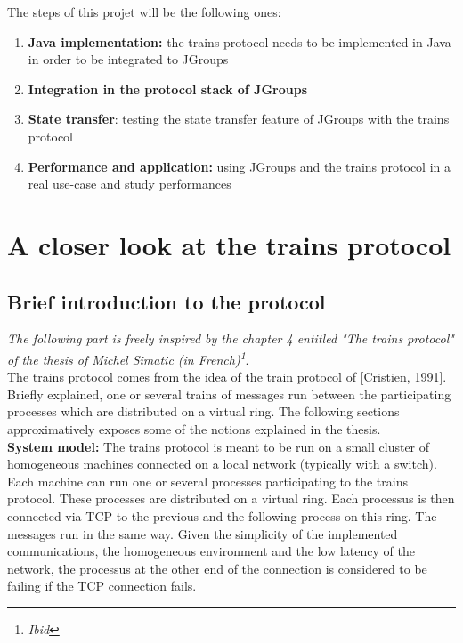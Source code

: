 \documentclass[a4paper,10pt]{report}
\begin{document}
The steps of this projet will be the following ones: 

\begin{enumerate}
  \item \textbf{Java implementation:} the trains protocol needs to be implemented in Java in order to be integrated to JGroups
  \item \textbf{Integration in the protocol stack of JGroups}
  \item \textbf{State transfer}: testing the state transfer feature of JGroups with the trains protocol
  \item \textbf{Performance and application:} using JGroups and the trains protocol in a real use-case and study performances
\end{enumerate}

\section{A closer look at the trains protocol}

\subsection{Brief introduction to the protocol}

\textit{The following part is freely inspired by the chapter 4 entitled "The trains protocol" of the thesis of Michel Simatic (in French)\footnote{\textit{Ibid}}}.\\

The trains protocol comes from the idea of the train protocol of [Cristien, 1991]. Briefly explained, one or several trains of messages
run between the participating processes which are distributed on a virtual ring. The following sections approximatively exposes some of the
notions explained in the thesis.\\


\textbf{System model:} The trains protocol is meant to be run on a small cluster of homogeneous machines connected on a local network (typically with a switch). Each machine
can run one or several processes participating to the trains protocol. These processes are distributed on a virtual ring. Each processus is then
connected via TCP to the previous and the following process on this ring. The messages run in the same way.
Given the simplicity of the implemented communications, the homogeneous environment and the low latency of the network, the processus at the other end of the connection is considered to be failing if the TCP connection fails.\\
\end{document}
